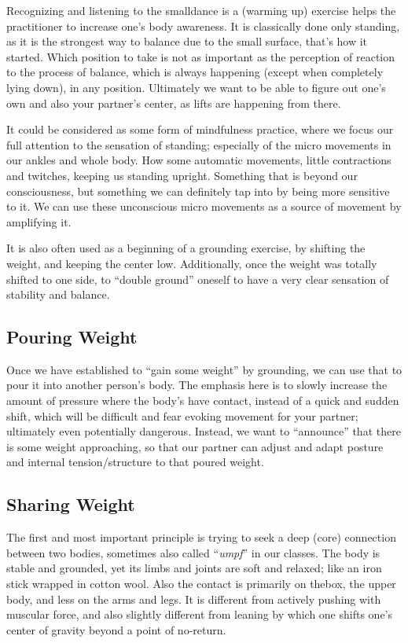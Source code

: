 Recognizing and listening to the \gls{smalldance} is a (warming up) exercise helps the practitioner to increase one's body awareness.
It is classically done only standing, as it is the strongest way to balance due to the small surface, that's how it started.
Which position to take is not as important as the perception of reaction to the process of balance, which is always happening (except when completely lying down), in any position.
Ultimately we want to be able to figure out one's own and also your partner's center, as lifts are happening from there.

It could be considered as some form of mindfulness practice, where we focus our full attention to the sensation of standing; especially of the micro movements in our ankles and whole body.
How some automatic movements, little contractions and twitches, keeping us standing upright.
Something that is beyond our consciousness, but something we can definitely tap into by being more sensitive to it.
We can use these unconscious micro movements as a source of movement by amplifying it.

It is also often used as a beginning of a grounding exercise, by shifting the weight, and keeping the center low.
Additionally, once the weight was totally shifted to one side, to ``double ground'' oneself to have a very clear sensation of stability and balance.

\subsection{Pouring Weight}\label{subsec:pouring-weight}

Once we have established to ``gain some weight'' by grounding, we can use that to pour it into another person's body.
The emphasis here is to slowly increase the amount of pressure where the body's have contact, instead of a quick and sudden shift, which will be difficult and fear evoking movement for your partner; ultimately even potentially dangerous.
Instead, we want to ``announce'' that there is some weight approaching, so that our partner can adjust and adapt posture and internal tension/structure to that poured weight.

\subsection{Sharing Weight}\label{subsec:sharing-weight}

The first and most important principle is trying to seek a deep (core) connection between two bodies, sometimes also called ``\textit{umpf}'' in our classes.
The body is stable and grounded, yet its limbs and joints are soft and relaxed; like an iron stick wrapped in cotton wool.
Also the contact is primarily on \gls{thebox}, the upper body, and less on the arms and legs.
It is different from actively pushing with muscular force, and also slightly different from leaning by which one shifts one's center of gravity beyond a point of no-return.

